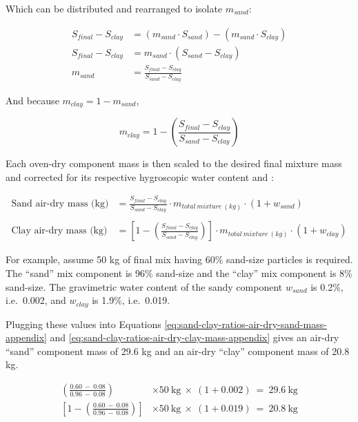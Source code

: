 \documentclass[
  letterpaper,
  openany]{book}
\begin{document}
Which can be distributed and rearranged to isolate \(m_{sand}\):

\begin{align}
S_{final} - S_{clay} &= ( m_{sand} \cdot S_{sand}) - (m_{sand} \cdot S_{clay}) \\ 
S_{final}  -S_{clay} &= m_{sand}\cdot( S_{sand} - S_{clay}) \\
m_{sand} &= \frac{S_{final} - S_{clay}}{S_{sand} - S_{clay}}
\end{align}

And because \(m_{clay}=1-m_{sand}\),

\begin{equation}
m_{clay} = 1 - \left( \frac{S_{final} - S_{clay}}{S_{sand} - S_{clay}} \right)
\end{equation}

Each oven-dry component mass is then scaled to the desired final mixture mass and corrected for its respective hygroscopic water content and :

\begin{align}
  \text{Sand~air-dry~mass~(kg)} &= \frac{S_{final}-S_{clay}}{S_{sand} - S_{clay}}  \cdot m_{total~mixture~(kg)} \cdot (1+w_{sand })
\label{eq:sand-clay-ratios-air-dry-sand-mass-appendix} \\
\nonumber \\
\text{Clay~air-dry~mass~(kg)} &= \left[1 - \left( \frac{S_{final} - S_{clay}}{S_{sand} - S_{clay}} \right) \right] \cdot m_{total~mixture~(kg)} \cdot (1+w_{clay})
\label{eq:sand-clay-ratios-air-dry-clay-mass-appendix}
\end{align}

For example, assume 50 kg of final mix having 60\% sand-size particles is required. The ``sand'' mix component is 96\% sand-size and the ``clay'' mix component is 8\% sand-size.
The gravimetric water content of the sandy component \(w_{sand}\) is 0.2\%, i.e.~0.002, and \(w_{clay}\) is 1.9\%, i.e.~0.019.

Plugging these values into Equations \eqref{eq:sand-clay-ratios-air-dry-sand-mass-appendix} and \eqref{eq:sand-clay-ratios-air-dry-clay-mass-appendix} gives an air-dry ``sand'' component mass of 29.6 kg and an air-dry ``clay'' component mass of 20.8 kg.

\begin{align}
\left(\frac{0.60~-~0.08}{0.96~-~0.08}\right)~&\times 50~\text{kg}~\times~(1+0.002)~=~29.6~\text{kg} \\
\left[ 1 - \left(\frac{0.60~-~0.08}{0.96~-~0.08}\right) \right] &\times 50~\text{kg}~\times~(1+0.019)~=~20.8~\text{kg}
\end{align}
\end{document}
